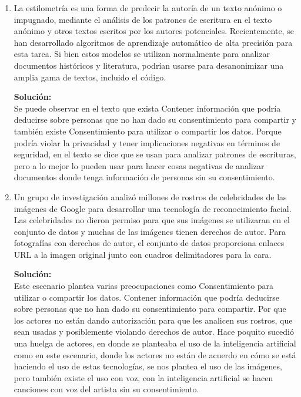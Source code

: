\documentclass[11pt,letterpaper]{article}
\newenvironment{solution}{%
  \noindent\begin{shaded}
  \textbf{Solución:}\ }{
  \end{shaded}%
}
\begin{document}
\begin{enumerate}
\begin{solution}
  \end{solution}
\item%
  La estilometría es una forma de predecir la autoría de un texto
  anónimo o impugnado, mediante el análisis de los patrones de
  escritura en el texto anónimo y otros textos escritos por los
  autores potenciales.  Recientemente, se han desarrollado algoritmos
  de aprendizaje automático de alta precisión para esta tarea.  Si
  bien estos modelos se utilizan normalmente para analizar documentos
  históricos y literatura, podrían usarse para desanonimizar una
  amplia gama de textos, incluido el código.
  \begin{solution}
    \\ Se puede observar en el texto que exista Contener información que podría deducirse sobre personas que no han dado su consentimiento para compartir y también existe Consentimiento para utilizar o compartir los datos. Porque podría violar la privacidad y tener implicaciones negativas en términos de seguridad, en el texto se dice que se usan para analizar patrones de escrituras, pero a lo mejor lo pueden usar para hacer cosas negativas de analizar documentos donde tenga información de personas sin su consentimiento.

  \end{solution}

\item%
  Un grupo de investigación analizó millones de rostros de
  celebridades de las imágenes de Google para desarrollar una
  tecnología de reconocimiento facial.  Las celebridades no dieron
  permiso para que sus imágenes se utilizaran en el conjunto de datos
  y muchas de las imágenes tienen derechos de autor.  Para fotografías
  con derechos de autor, el conjunto de datos proporciona enlaces URL
  a la imagen original junto con cuadros delimitadores para la cara.
  \begin{solution}
    \\Este escenario plantea varias preocupaciones como Consentimiento para utilizar o compartir los datos.   Contener información que podría deducirse sobre personas que no han dado su consentimiento para compartir. Por que los actores no están dando autorización para que les analicen sus rostros, que sean usadas y posiblemente violando derechos de autor. Hace poquito sucedió una huelga de actores, en donde se planteaba el uso de la inteligencia artificial como en este escenario, donde los actores no están de acuerdo en cómo se está haciendo el uso de estas tecnologías, se nos plantea el uso de las imágenes, pero también existe el uso con voz, con la inteligencia artificial se hacen canciones con voz del artista sin su consentimiento.


\end{solution}
\end{enumerate}
\end{document}
